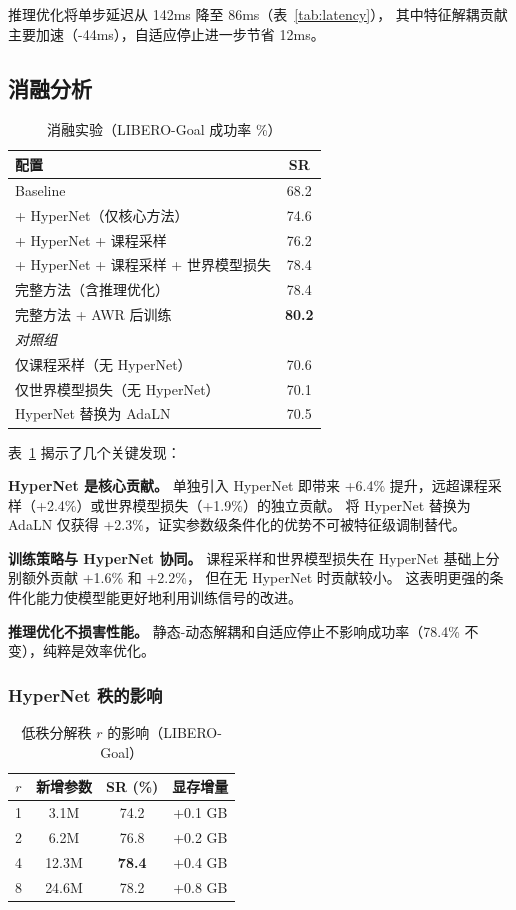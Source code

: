 \documentclass[10pt,twocolumn]{ctexart}
\begin{document}
推理优化将单步延迟从 142ms 降至 86ms（表~\ref{tab:latency}），
其中特征解耦贡献主要加速（-44ms），自适应停止进一步节省 12ms。

\subsection{消融分析}

\begin{table}[t]
\centering
\caption{消融实验（LIBERO-Goal 成功率 \%）}
\label{tab:ablation}
\begin{tabular}{lc}
\toprule
配置 & SR \\
\midrule
Baseline & 68.2 \\
\midrule
+ HyperNet（仅核心方法） & 74.6 \\
+ HyperNet + 课程采样 & 76.2 \\
+ HyperNet + 课程采样 + 世界模型损失 & 78.4 \\
\midrule
完整方法（含推理优化） & 78.4 \\
完整方法 + AWR 后训练 & \textbf{80.2} \\
\midrule
\textit{对照组} & \\
\quad 仅课程采样（无 HyperNet） & 70.6 \\
\quad 仅世界模型损失（无 HyperNet） & 70.1 \\
\quad HyperNet 替换为 AdaLN & 70.5 \\
\bottomrule
\end{tabular}
\end{table}

表~\ref{tab:ablation} 揭示了几个关键发现：

\textbf{HyperNet 是核心贡献。}
单独引入 HyperNet 即带来 +6.4\% 提升，远超课程采样（+2.4\%）或世界模型损失（+1.9\%）的独立贡献。
将 HyperNet 替换为 AdaLN 仅获得 +2.3\%，证实参数级条件化的优势不可被特征级调制替代。

\textbf{训练策略与 HyperNet 协同。}
课程采样和世界模型损失在 HyperNet 基础上分别额外贡献 +1.6\% 和 +2.2\%，
但在无 HyperNet 时贡献较小。
这表明更强的条件化能力使模型能更好地利用训练信号的改进。

\textbf{推理优化不损害性能。}
静态-动态解耦和自适应停止不影响成功率（78.4\% 不变），纯粹是效率优化。

\subsubsection{HyperNet 秩的影响}

\begin{table}[t]
\centering
\caption{低秩分解秩 $r$ 的影响（LIBERO-Goal）}
\label{tab:rank}
\begin{tabular}{cccc}
\toprule
$r$ & 新增参数 & SR (\%) & 显存增量 \\
\midrule
1 & 3.1M & 74.2 & +0.1 GB \\
2 & 6.2M & 76.8 & +0.2 GB \\
4 & 12.3M & \textbf{78.4} & +0.4 GB \\
8 & 24.6M & 78.2 & +0.8 GB \\
\bottomrule
\end{tabular}
\end{table}
\end{document}
